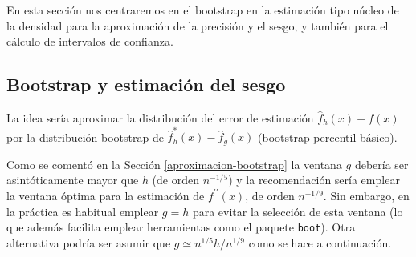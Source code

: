 \documentclass[
]{book}
\theoremstyle{break}
\theoremstyle{definition}
\theoremstyle{definition}
\theoremstyle{definition}
\theoremstyle{definition}
\theoremstyle{remark}
\begin{document}
En esta sección nos centraremos en el bootstrap en la estimación tipo núcleo de la densidad para la aproximación de la precisión y el sesgo, y también para el cálculo de intervalos de confianza.

\hypertarget{bootstrap-y-estimaciuxf3n-del-sesgo}{%
\subsection{Bootstrap y estimación del sesgo}\label{bootstrap-y-estimaciuxf3n-del-sesgo}}

La idea sería aproximar la distribución del error de estimación \(\hat f_h(x) - f(x)\) por la distribución bootstrap de \(\hat f^{\ast}_h(x) - \hat f_g(x)\) (bootstrap percentil básico).

Como se comentó en la Sección \ref{aproximacion-bootstrap} la ventana \(g\) debería ser asintóticamente mayor que \(h\) (de orden \(n^{-1/5}\)) y la recomendación sería emplear la ventana óptima para la estimación de \(f^{\prime \prime }\left( x \right)\), de orden \(n^{-1/9}\).
Sin embargo, en la práctica es habitual emplear \(g=h\) para evitar la selección de esta ventana (lo que además facilita emplear herramientas como el paquete \texttt{boot}).
Otra alternativa podría ser asumir que \(g \simeq n^{1/5}h/n^{1/9}\) como se hace a continuación.
\end{document}
